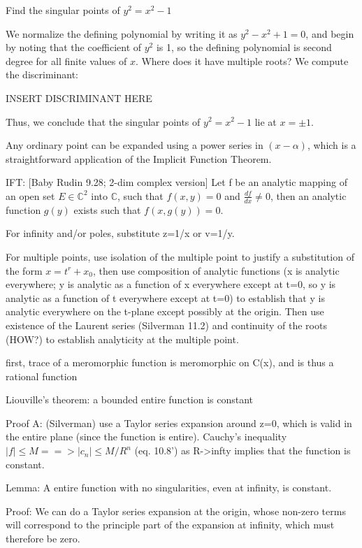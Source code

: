 \example Find the singular points of $y^2 = x^2 - 1$

We normalize the defining polynomial by writing it as $y^2 - x^2 + 1 =
0$, and begin by noting that the coefficient of $y^2$ is 1, so the
defining polynomial is second degree for all finite values of $x$.
Where does it have multiple roots?  We compute the discriminant:

INSERT DISCRIMINANT HERE

Thus, we conclude that the singular points of $y^2 = x^2 - 1$ lie at
$x = \pm 1$.

\endexample

Any ordinary point can be expanded using a power series in
$(x-\alpha)$, which is a straightforward application of the Implicit
Function Theorem.

IFT: [Baby Rudin 9.28; 2-dim complex version] Let f be an analytic
mapping of an open set $E \in {\mathbb C}^2$ into ${\mathbb C}$, such
that $f(x,y)=0$ and $\frac{df}{dx} \ne 0$, then an analytic
function $g(y)$ exists such that $f(x,g(y))=0$.

For infinity and/or poles, substitute z=1/x or v=1/y.

For multiple points, use isolation of the multiple point to justify a
substitution of the form $x=t^r+x_0$, then use composition of analytic
functions (x is analytic everywhere; y is analytic as a function of x
everywhere except at t=0, so y is analytic as a function of t
everywhere except at t=0) to establish that y is analytic everywhere
on the t-plane except possibly at the origin.  Then use existence of
the Laurent series (Silverman 11.2) and continuity of the roots (HOW?)
to establish analyticity at the multiple point.


first, trace of a meromorphic function is meromorphic on C(x), and is
thus a rational function

Liouville's theorem: a bounded entire function is constant

Proof A: (Silverman) use a Taylor series expansion around z=0, which
is valid in the entire plane (since the function is entire).  Cauchy's
inequality $|f| \le M ==> |c_n| \le M/{R^n}$ (eq. 10.8') as R->infty
implies that the function is constant.

Lemma: A entire function with no singularities, even at infinity, is
constant.

Proof: We can do a Taylor series expansion at the origin, whose
non-zero terms will correspond to the principle part of the expansion
at infinity, which must therefore be zero.

